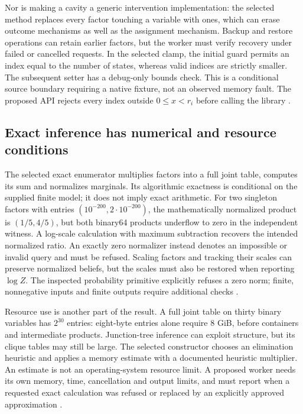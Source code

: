 Nor is making a cavity a generic intervention implementation: the selected
method replaces every factor touching a variable with ones, which can erase
outcome mechanisms as well as the assignment mechanism. Backup and restore
operations can retain earlier factors, but the worker must verify recovery
under failed or cancelled requests. In the selected clamp, the initial
guard permits an index equal to the number of states, whereas valid indices
are strictly smaller. The subsequent setter has a debug-only bounds check.
This is a conditional source boundary requiring a native fixture, not an
observed memory fault. The proposed API rejects every index outside
$0\leq x<r_i$ before calling the library
\citep{exec24_libdai_source,exec24_libdai_choice}.

\subsection{Exact inference has numerical and resource conditions}
The selected exact enumerator multiplies factors into a full joint table,
computes its sum and normalizes marginals. Its algorithmic exactness is
conditional on the supplied finite model; it does not imply exact arithmetic.
For two singleton factors with entries $(10^{-200},2\cdot10^{-200})$, the
mathematically normalized product is $(1/5,4/5)$, but both binary64 products
underflow to zero in the independent witness. A log-scale calculation with
maximum subtraction recovers the intended normalized ratio. An exactly zero
normalizer instead denotes an impossible or invalid query and must be
refused. Scaling factors and tracking their scales can preserve normalized
beliefs, but the scales must also be restored when reporting $\log Z$.
The inspected probability primitive explicitly refuses a zero norm;
finite, nonnegative inputs and finite outputs require additional checks
\citep{exec24_libdai_source,exec24_libdai_choice}.

Resource use is another part of the result. A full joint table on thirty
binary variables has $2^{30}$ entries: eight-byte entries alone require
8 GiB, before containers and intermediate products. Junction-tree inference
can exploit structure, but its clique tables may still be large. The
selected constructor chooses an elimination heuristic and applies a memory
estimate with a documented heuristic multiplier. An estimate is not an
operating-system resource limit. A proposed worker needs its own memory,
time, cancellation and output limits, and must report when a requested
exact calculation was refused or replaced by an explicitly approved
approximation \citep{exec24_libdai_source,exec24_libdai_choice}.

